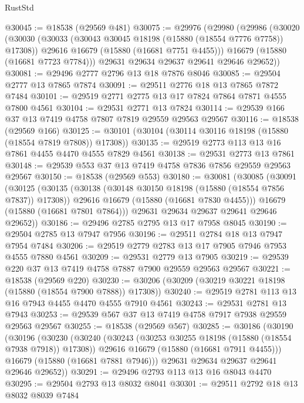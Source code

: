 \begin{lexlean}{RustStd}
\begin{coremodule}
@30045 := @18538 (@29569 @481)
@30075 := @29976
    (@29980
      (@29986
        (@30020
          (@30030
            (@30033 (@30043 @30045 @18198 (@15880 (@18554 @7776 @7758)) @17308))
            @29616
            @16679
            (@15880 (@16681 @7751 @4455)))
          @16679
          (@15880 (@16681 @7723 @7784)))
        @29631
        @29634
        @29637
        @29641
        @29646
        @29652))
@30081 := @29496 @2777 @2796 @13 @18 @7876 @8046
@30085 := @29504 @2777 @13 @7865 @7874
@30091 := @29511 @2776 @18 @13 @7865 @7872 @7484
@30101 := @29519 @2771 @2775 @13 @17 @7824 @7864 @7871 @4555 @7800 @4561
@30104 := @29531 @2771 @13 @7824
@30114 := @29539 @166 @37 @13 @7419 @4758 @7807 @7819 @29559 @29563 @29567
@30116 := @18538 (@29569 @166)
@30125 := @30101 (@30104 (@30114 @30116 @18198 (@15880 (@18554 @7819 @7808)) @17308))
@30135 := @29519 @2773 @113 @13 @16 @7861 @4455 @4470 @4555 @7829 @4561
@30138 := @29531 @2773 @13 @7861
@30148 := @29539 @553 @37 @13 @7419 @4758 @7836 @7856 @29559 @29563 @29567
@30150 := @18538 (@29569 @553)
@30180 := @30081
    (@30085
      (@30091
        (@30125
          (@30135
            (@30138 (@30148 @30150 @18198 (@15880 (@18554 @7856 @7837)) @17308))
            @29616
            @16679
            (@15880 (@16681 @7830 @4455)))
          @16679
          (@15880 (@16681 @7801 @7864)))
        @29631
        @29634
        @29637
        @29641
        @29646
        @29652))
@30186 := @29496 @2785 @2795 @13 @17 @7958 @8045
@30190 := @29504 @2785 @13 @7947 @7956
@30196 := @29511 @2784 @18 @13 @7947 @7954 @7484
@30206 := @29519 @2779 @2783 @13 @17 @7905 @7946 @7953 @4555 @7880 @4561
@30209 := @29531 @2779 @13 @7905
@30219 := @29539 @220 @37 @13 @7419 @4758 @7887 @7900 @29559 @29563 @29567
@30221 := @18538 (@29569 @220)
@30230 := @30206 (@30209 (@30219 @30221 @18198 (@15880 (@18554 @7900 @7888)) @17308))
@30240 := @29519 @2781 @113 @13 @16 @7943 @4455 @4470 @4555 @7910 @4561
@30243 := @29531 @2781 @13 @7943
@30253 := @29539 @567 @37 @13 @7419 @4758 @7917 @7938 @29559 @29563 @29567
@30255 := @18538 (@29569 @567)
@30285 := @30186
    (@30190
      (@30196
        (@30230
          (@30240
            (@30243 (@30253 @30255 @18198 (@15880 (@18554 @7938 @7918)) @17308))
            @29616
            @16679
            (@15880 (@16681 @7911 @4455)))
          @16679
          (@15880 (@16681 @7881 @7946)))
        @29631
        @29634
        @29637
        @29641
        @29646
        @29652))
@30291 := @29496 @2793 @113 @13 @16 @8043 @4470
@30295 := @29504 @2793 @13 @8032 @8041
@30301 := @29511 @2792 @18 @13 @8032 @8039 @7484

\end{coremodule}
\end{lexlean}

